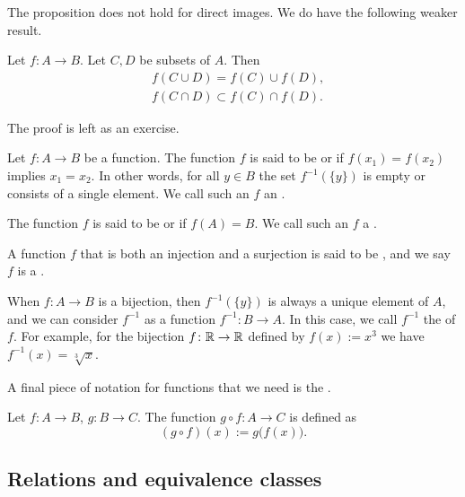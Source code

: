 The proposition does not hold for direct images.  We do have
the following weaker result.

\begin{prop} \label{st:propfor}
Let $f \colon A \to B$.  Let $C, D$ be subsets of $A$.  Then
\begin{align*}
& f( C \cup D) = f (C) \cup f (D) , \\
& f( C \cap D) \subset f (C) \cap f (D) .
\end{align*}
\end{prop}

The proof is left as an exercise.

\begin{defn}
Let $f \colon A \to B$ be a function.
The function $f$ is said to be
\emph{} or
\emph{} if $f(x_1) = f(x_2)$ implies $x_1 = x_2$.  In
other words,
for all $y \in B$ the set
$f^{-1}(\{y\})$ is empty or consists of a single element.
We call such an $f$ an \emph{}.

The function $f$ is said to be
\emph{} or
\emph{} if $f(A) = B$.
We call such an $f$ a \emph{}.

A function $f$ that is both an injection and a surjection is
said to be \emph{}, and we say $f$ is a
\emph{}.
\end{defn}

When $f \colon A \to B$ is a bijection, then $f^{-1}(\{y\})$ is always
a unique element of $A$, and we can consider $f^{-1}$ as a function
$f^{-1} \colon B \to A$.
In this case, we call $f^{-1}$ the \emph{} of $f$.
For example, for the bijection $f \colon {\mathbb{R}} \to {\mathbb{R}}$ defined by $f(x) := x^3$ we have
$f^{-1}(x) = \sqrt[3]{x}$.

A final piece of notation for functions that
we need is the \emph{}.

\begin{defn}
Let $f \colon A \to B$, $g \colon B \to C$.  The function 
$g \circ f \colon A \to C$ is defined as
\begin{equation*}
(g \circ f)(x) := g\bigl(f(x)\bigr) .
\end{equation*}
\end{defn}

\subsection{Relations and equivalence classes}


